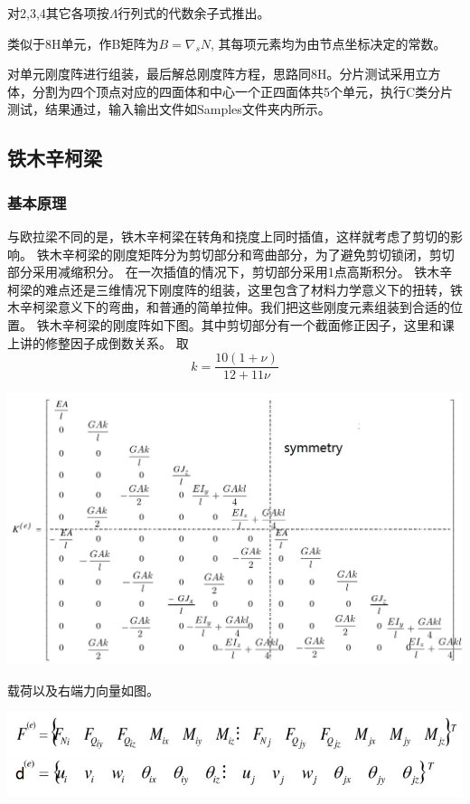 \documentclass[UTF8]{ctexbook}
\begin{document}
对2,3,4其它各项按$\Lambda$行列式的代数余子式推出。

类似于8H单元，作B矩阵为$B=\nabla_{s}N$, 其每项元素均为由节点坐标决定的常数。

对单元刚度阵进行组装，最后解总刚度阵方程，思路同8H。分片测试采用立方体，分割为四个顶点对应的四面体和中心一个正四面体共5个单元，执行C类分片测试，结果通过，输入输出文件如Samples文件夹内所示。
\subsection{铁木辛柯梁}
\subsubsection{基本原理}
与欧拉梁不同的是，铁木辛柯梁在转角和挠度上同时插值，这样就考虑了剪切的影响。
铁木辛柯梁的刚度矩阵分为剪切部分和弯曲部分，为了避免剪切锁闭，剪切部分采用减缩积分。
在一次插值的情况下，剪切部分采用1点高斯积分。
铁木辛柯梁的难点还是三维情况下刚度阵的组装，这里包含了材料力学意义下的扭转，铁木辛柯梁意义下的弯曲，和普通的简单拉伸。我们把这些刚度元素组装到合适的位置。
铁木辛柯梁的刚度阵如下图。其中剪切部分有一个截面修正因子，这里和课上讲的修整因子成倒数关系。
取
$$k=\frac{10(1+\nu)}{12+11\nu}$$
\begin{center}
\includegraphics[width=1.0\textwidth]{timoshenko1.png}
\end{center}
载荷以及右端力向量如图。
\begin{center}
\includegraphics[width=1.0\textwidth]{beam2.png}
\end{center}
\end{document}

